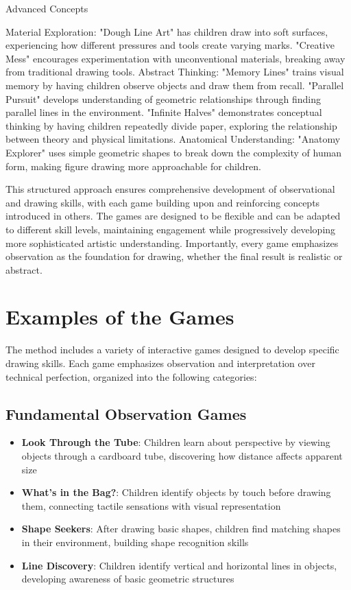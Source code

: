 \documentclass{article}
\begin{document}
Advanced Concepts

Material Exploration: "Dough Line Art" has children draw into soft surfaces, experiencing how different pressures and tools create varying marks. "Creative Mess" encourages experimentation with unconventional materials, breaking away from traditional drawing tools.
Abstract Thinking: "Memory Lines" trains visual memory by having children observe objects and draw them from recall. "Parallel Pursuit" develops understanding of geometric relationships through finding parallel lines in the environment. "Infinite Halves" demonstrates conceptual thinking by having children repeatedly divide paper, exploring the relationship between theory and physical limitations.
Anatomical Understanding: "Anatomy Explorer" uses simple geometric shapes to break down the complexity of human form, making figure drawing more approachable for children.



This structured approach ensures comprehensive development of observational and drawing skills, with each game building upon and reinforcing concepts introduced in others. The games are designed to be flexible and can be adapted to different skill levels, maintaining engagement while progressively developing more sophisticated artistic understanding. Importantly, every game emphasizes observation as the foundation for drawing, whether the final result is realistic or abstract.

\section{Examples of the Games}

The method includes a variety of interactive games designed to develop specific drawing skills. Each game emphasizes observation and interpretation over technical perfection, organized into the following categories:

\subsection{Fundamental Observation Games}
\begin{itemize}
    \item \textbf{Look Through the Tube}: Children learn about perspective by viewing objects through a cardboard tube, discovering how distance affects apparent size
    \item \textbf{What's in the Bag?}: Children identify objects by touch before drawing them, connecting tactile sensations with visual representation
    \item \textbf{Shape Seekers}: After drawing basic shapes, children find matching shapes in their environment, building shape recognition skills
    \item \textbf{Line Discovery}: Children identify vertical and horizontal lines in objects, developing awareness of basic geometric structures
\end{itemize}
\end{document}
